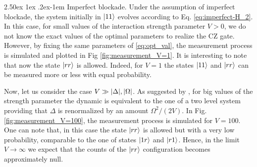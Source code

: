 \documentclass[rmp,10pt,onecolumn,fleqn,notitlepage]{revtex4-1}
\makeatletter
\renewcommand{\paragraph}{%
    \@startsection{paragraph}{4}%
    {\z@}{2.50ex \@plus 1ex \@minus .2ex}{-1em}%
    {\bf\sffamily}%
}
\makeatother
\begin{document}
\paragraph{Imperfect blockade.} Under the assumption of imperfect blockade, the system initially in $\left\vert{11}\right\rangle$ evolves according to Eq. \eqref{eq:imperfect-H_2}. 
In this case, for small values of the interaction strength parameter $V>0$, we do not know the exact values of the optimal parameters to realize the CZ gate. However, by fixing the same parameters of \eqref{eq:opt_val}, the measurement process is simulated and plotted in Fig \ref{fig:measurement_V=1}. It is interesting to note that now the state $\left\vert{rr}\right\rangle$ is allowed. Indeed, for $V=1$ the states $\left\vert{11}\right\rangle$ and $\left\vert{rr}\right\rangle$ can be measured more or less with equal probability. 

Now, let us consider the case $V\gg\abs{\Delta},\abs{\Omega}$.
As suggested by \cite{PhysRevLett.123.170503}, for big values of the strength parameter the dynamic is equivalent to the one of a two level system providing that $\Delta$ is renormalized by an amount $\Omega^2/(2V)$.
In Fig. \ref{fig:measurement_V=100}, the measurement process is simulated for $V=100$. One can note that, in this case the state $\left\vert{rr}\right\rangle$ is allowed but with a very low probability, comparable to the one of states $\left\vert{1r}\right\rangle$ and $\left\vert{r1}\right\rangle$. Hence, in the limit $V\rightarrow \infty$ we expect that the counts of the $\left\vert{rr}\right\rangle$ configuration becomes approximately null.
\end{document}
